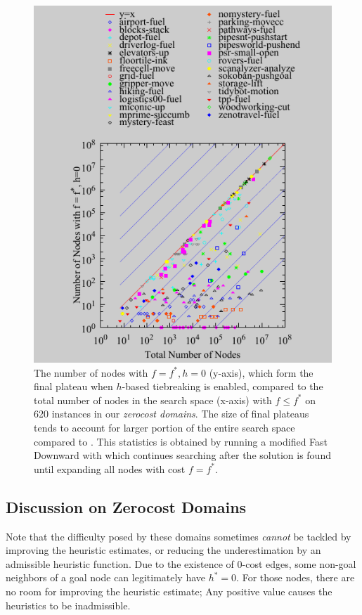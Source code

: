 \begin{figure}[htbp]
  \centering
  \includegraphics{tables/aaai16-frontier/zerocost/lmcut_frontier-front.pdf}
  \caption{
 The number of nodes with $f=f^*, h=0$ (y-axis), which form
  the final plateau when $h$-based tiebreaking is enabled, compared to
 the total number of nodes in the search space (x-axis) with
 $f\leq f^*$ on 620 instances in our \emph{zerocost domains}.
 The size of final plateaus tends to account for larger portion of the
 entire search space compared to .
 This statistics is obtained by running a modified Fast Downward with
 \lmcut which continues searching after the solution is found
 until expanding all nodes with cost $f=f^*$.
 }
 \label{fig:plateau-zerocost}
\end{figure}

\subsection{Discussion on Zerocost Domains}

Note that the difficulty posed by these domains sometimes \emph{cannot}
be tackled by improving the heuristic estimates, or reducing the
underestimation by an admissible heuristic function.  Due to the
existence of 0-cost edges, some non-goal neighbors of a goal node can
legitimately have $h^*=0$. For those nodes,
there are no room for improving the heuristic estimate; Any positive
value causes the heuristics to be inadmissible.

